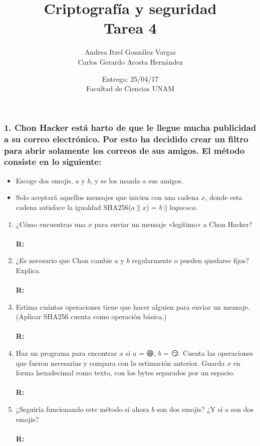 \documentclass[14pt]{article}
\title{Criptografía y seguridad \\ Tarea 4}
\author{Andrea Itzel González Vargas \\ Carlos Gerardo Acosta Hernández}
\date{Entrega: 25/04/17 \\ Facultad de Ciencias UNAM}
\begin{document}
\maketitle

\subsubsection*{1. Chon Hacker está harto de que le llegue mucha publicidad a su correo electrónico. Por esto ha decidido crear un filtro para abrir solamente los correos de sus amigos. El método consiste en lo siguiente:}
\begin{itemize}
\item Escoge dos emojis, $a$ y $b$, y se los manda a sus amigos.
\item Solo aceptará aquellos mensajes que inicien con una cadena $x$, donde esta cadena satisface la igualdad SHA256($a \parallel x$) = $b \parallel loquesea$.
\end{itemize}

\begin{enumerate}[label=\alph*)]
\item ¿Cómo encuentras una $x$ para enviar un mensaje «legítimo» a Chon Hacker? \\ \\
\textbf{R:} 
  
\item ¿Es necesario que Chon cambie $a$ y $b$ regularmente o pueden quedarse fijos? Explica. \\ \\
  \textbf{R:} 
  
\item Estima cuántas operaciones tiene que hacer alguien para enviar un mensaje. (Aplicar SHA256 cuenta como operación básica.) \\ \\
  \textbf{R:}
  
\item Haz un programa para encontrar $x$ si $a$ = 😄, $b$ = 😏. Cuenta las operaciones que fueron necesarias y compara con la estimación anterior. Guarda $x$ en forma hexadecimal como texto, con los bytes separados por un espacio. \\ \\
  \textbf{R:}
  
\item ¿Seguiría funcionando este método si ahora $b$ son dos emojis? ¿Y si a son dos emojis? \\ \\
  \textbf{R:}
\end{enumerate}
\end{document}

